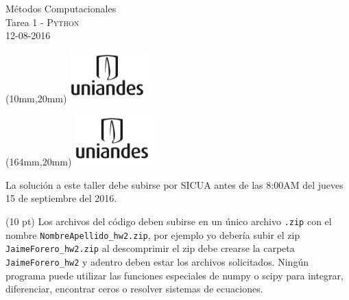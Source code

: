 \documentclass[11pt,letterpaper]{exam}
\begin{document}
\begin{center}
{\Large M\'etodos Computacionales} \\
Tarea 1 - \textsc{Python}\\
12-08-2016\\
\end{center}

\begin{textblock*}{40mm}(10mm,20mm)
  \includegraphics[width=3cm]{logoUniandes.png}
\end{textblock*}

\begin{textblock*}{40mm}(164mm,20mm)
  \includegraphics[width=3cm]{logoUniandes.png}
\end{textblock*}

\vspace{0.3cm}

\noindent
La solución a este taller debe subirse por SICUA antes de las 8:00AM
del jueves 15 de septiembre del 2016. 
\noindent

(10 pt) Los archivos del c\'odigo  deben subirse en un
\'unico archivo \verb".zip" con el nombre
\verb"NombreApellido_hw2.zip", por ejemplo yo deber\'ia subir el zip
\verb"JaimeForero_hw2.zip" al descomprimir el zip debe crearse la
carpeta \verb"JaimeForero_hw2" y adentro deben estar los archivos
solicitados.
Ning\'un programa puede utilizar las funciones especiales de numpy o
scipy para integrar, diferenciar, encontrar ceros o resolver sistemas
de ecuaciones. 


\vspace{0.3cm}
\end{document}
